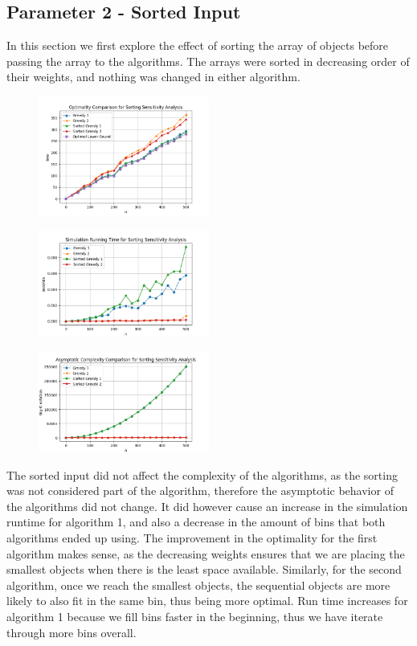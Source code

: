 \documentclass[11pt]{article}
\begin{document}
\subsection{Parameter 2 - Sorted Input}
In this section we first explore the effect of sorting the array of objects before passing the
array to the algorithms. The arrays were sorted in decreasing order of their weights, and
nothing was changed in either algorithm.
\begin{figure}[H]
	\centering
	\includegraphics[width=0.5\textwidth]{images/s2_optimality.png}
\end{figure}
\begin{figure}[H]
	\centering
	\includegraphics[width=0.5\textwidth]{images/s2_simtime.png}
\end{figure}
\begin{figure}[H]
	\centering
	\includegraphics[width=0.5\textwidth]{images/s2_complexity.png}
\end{figure}
The sorted input did not affect the complexity of the algorithms, as the sorting was
not considered part of the algorithm, therefore the asymptotic behavior of the algorithms did not change. It did however cause an increase in the simulation
runtime for algorithm 1, and also a decrease in the amount of bins that both algorithms ended up using. The
improvement in the optimality for the first algorithm makes sense, as the decreasing weights
ensures that we are placing the smallest objects when there is the least space available.
Similarly, for the second algorithm, once we reach the smallest objects, the sequential objects
are more likely to also fit in the same bin, thus being more optimal. Run time increases for
algorithm 1 because we fill bins faster in the beginning, thus we have iterate through more bins
overall.




%
\end{document}
